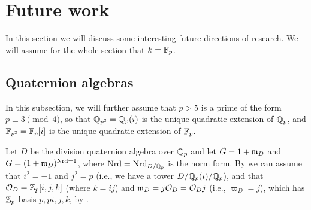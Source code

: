 \section{Future work}%
\label{sec:future}

In this section we will discuss some interesting future directions of research. We will assume for the whole section that $k = \mathbb{F}_{p}$.

\subsection{Quaternion algebras}%
\label{subsec:quat-algs}

In this subsection, we will further assume that $p>5$ is a prime of the form $p \equiv 3 \pmod{4}$, so that $\mathbb{Q}_{p^{2}} = \mathbb{Q}_{p}(i)$ is the unique quadratic extension of $\mathbb{Q}_{p}$, and $\mathbb{F}_{p^{2}} = \mathbb{F}_{p}[i]$ is the unique quadratic extension of $\mathbb{F}_{p}$.

Let $D$ be the division quaternion algebra over $\mathbb{Q}_{p}$ and let $\tilde{G} = 1+\mathfrak{m}_{D}$ and $G = (1+\mathfrak{m}_{D})^{\operatorname{Nrd} = 1}$, where $\operatorname{Nrd} = \operatorname{Nrd}_{D/\mathbb{Q}_{p}}$ is the norm form. By \cite[Thm.~12.1.5]{Voight} we can assume that $i^{2} = -1$ and $j^{2} = p$ (i.e., we have a tower $D / \mathbb{Q}_{p}(i) / \mathbb{Q}_{p}$), and that $\mathcal{O}_{D}=\mathbb{Z}_{p}[i,j,k]$ (where $k=ij$) and $\mathfrak{m}_{D} = j\mathcal{O}_{D} = \mathcal{O}_{D}j$ (i.e., $\varpi_{D} = j$), which has $\mathbb{Z}_{p}$-basis $p,pi,j,k$, by \cite[Thm.13.1.6]{Voight}.


